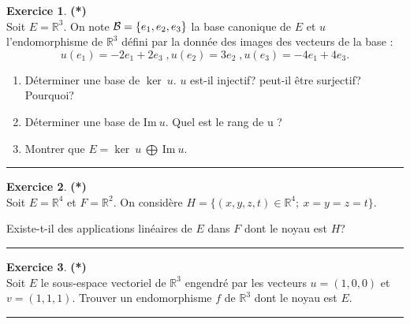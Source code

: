 \documentclass[a4paper,11pt]{article}
\theoremstyle{definition}
\newtheorem{exo}{Exercice} %
\begin{document}
\begin{minipage}{1\linewidth}\begin{minipage}[t]{0.48\linewidth}\raggedright
		
		\begin{exo}\textbf{(*)}\quad\\[0.2cm]
			Soit $E=\mathbb R^3$. On note ${\cal B}=\{e_1,e_2,e_3\}$ la base canonique de $E$ et $u$ l'endomorphisme de $\mathbb R^3$ défini par la donnée des images des vecteurs de la base : 
			$$u(e_1) = -2e_1 +2e_3 \; , u(e_2)=3e_2 \; , u(e_3)=-4e_1 + 4e_3.$$ 
			\begin{enumerate}
				\item Déterminer une base de $\ker~u$. 
				$u$ est-il injectif? peut-il être surjectif? Pourquoi?
				\item Déterminer une base de $\textrm{Im}~u$. Quel est le rang de u ?
				\item Montrer que $E=\ker~u \ \bigoplus \  \textrm{Im}~u$.
			\end{enumerate}
			
			
			\centering\rule{1\linewidth}{0.6pt}\end{exo}
		
		
		
		\begin{exo}\textbf{(*)}\quad\\[0.2cm]
			Soit $E=\mathbb R^4$ et $F=\mathbb R^2$. On considère
			$H=\{(x,y,z,t)\in\mathbb R^4;\ x=y=z=t\}$.
			
			Existe-t-il des applications linéaires de $E$ dans $F$
			dont le noyau est $H$?
			
			\centering\rule{1\linewidth}{0.6pt}\end{exo}
		

		
		
	\end{minipage}\hfill\vrule\hfill\begin{minipage}[t]{0.48\linewidth}\raggedright
		
			\begin{exo}\textbf{(*)}\quad\\[0.2cm]
			Soit $E$ le sous-espace vectoriel de $\mathbb R^3$ engendré par les vecteurs
			$u=(1,0,0)$ et $v=(1,1,1)$. Trouver un endomorphisme $f$ de $\mathbb R^3$ dont le noyau est $E$.
			
			\centering\rule{1\linewidth}{0.6pt}\end{exo}
		

\end{minipage}
\end{minipage}
\end{document}
